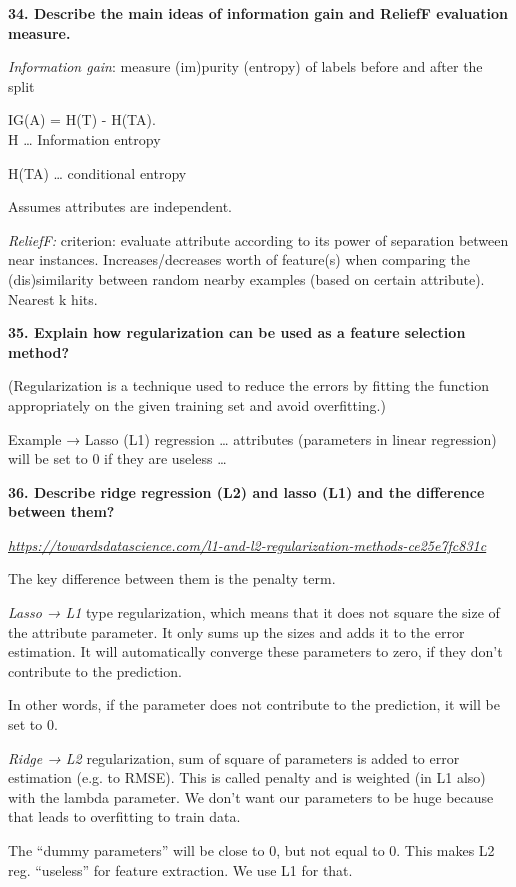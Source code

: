 \textbf{34. Describe the main ideas of information gain and ReliefF
evaluation measure.}

\textit{Information gain}: measure (im)purity (entropy) of labels
before and after the split

IG(A) = H(T) - H(T\textbar A).\\
H \ldots{} Information entropy

H(T\textbar A) \ldots{} conditional entropy

Assumes attributes are independent.

\textit{ReliefF:} criterion: evaluate attribute according to its
power of separation between near instances. Increases/decreases worth of
feature(s) when comparing the (dis)similarity between random nearby
examples (based on certain attribute). Nearest k hits.

\textbf{35. Explain how regularization can be used as a feature
selection method?}

(Regularization is a technique used to reduce the errors by fitting the
function appropriately on the given training set and avoid overfitting.)

Example → Lasso (L1) regression \ldots{} attributes (parameters in
linear regression) will be set to 0 if they are useless \ldots{}

\textbf{36. Describe ridge regression (L2) and lasso (L1) and the
difference between them?}

\href{https://towardsdatascience.com/l1-and-l2-regularization-methods-ce25e7fc831c}{\textit{https://towardsdatascience.com/l1-and-l2-regularization-methods-ce25e7fc831c}}

The key difference between them is the penalty term.

\textit{Lasso → L1} type regularization, which means that it does not
square the size of the attribute parameter. It only sums up the sizes
and adds it to the error estimation. It will automatically converge
these parameters to zero, if they don't contribute to the prediction.

In other words, if the parameter does not contribute to the prediction,
it will be set to 0.

\textit{Ridge → L2} regularization, sum of square of parameters is
added to error estimation (e.g. to RMSE). This is called penalty and is
weighted (in L1 also) with the lambda parameter. We don't want our
parameters to be huge because that leads to overfitting to train data.

The ``dummy parameters'' will be close to 0, but not equal to 0. This
makes L2 reg. ``useless'' for feature extraction. We use L1 for that.

